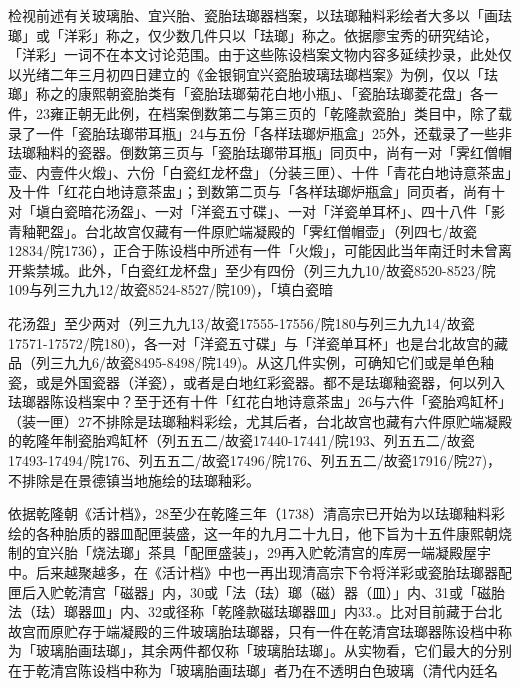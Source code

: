 
检视前述有关玻璃胎、宜兴胎、瓷胎珐瑯器档案，以珐瑯釉料彩绘者大多以「画珐瑯」或「洋彩」称之，仅少数几件只以「珐瑯」称之。依据廖宝秀的研究结论，「洋彩」一词不在本文讨论范围。由于这些陈设档案文物内容多延续抄录，此处仅以光绪二年三月初四日建立的《金银铜宜兴瓷胎玻璃珐瑯档案》为例，仅以「珐瑯」称之的康熙朝瓷胎类有「瓷胎珐瑯菊花白地小瓶」、「瓷胎珐瑯菱花盘」各一件，23雍正朝无此例，在档案倒数第二与第三页的「乾隆款瓷胎」类目中，除了载录了一件「瓷胎珐瑯带耳瓶」24与五份「各样珐瑯炉瓶盒」25外，还载录了一些非珐瑯釉料的瓷器。倒数第三页与「瓷胎珐瑯带耳瓶」同页中，尚有一对「霁红僧帽壶、内壹件火煅」、六份「白瓷红龙杯盘」（分装三匣）、十件「青花白地诗意茶盅」及十件「红花白地诗意茶盅」；到数第二页与「各样珐瑯炉瓶盒」同页者，尚有十对「塡白瓷暗花汤盌」、一对「洋瓷五寸碟」、一对「洋瓷单耳杯」、四十八件「影青釉靶盌」。台北故宫仅藏有一件原贮端凝殿的「霁红僧帽壶」（列四七/故瓷12834/院1736），正合于陈设档中所述有一件「火煅」，可能因此当年南迁时未曾离开紫禁城。此外，「白瓷红龙杯盘」至少有四份（列三九九10/故瓷8520-8523/院109与列三九九12/故瓷8524-8527/院109)，「填白瓷暗

\vfill
\begin{BookNotes}
\end{BookNotes}


\noindent 花汤盌」至少两对（列三九九13/故瓷17555-17556/院180与列三九九14/故瓷17571-17572/院180)，各一对「洋瓷五寸碟」与「洋瓷单耳杯」也是台北故宫的藏品（列三九九6/故瓷8495-8498/院149)。从这几件实例，可确知它们或是单色釉瓷，或是外国瓷器（洋瓷），或者是白地红彩瓷器。都不是珐瑯釉瓷器，何以列入珐瑯器陈设档案中？至于还有十件「红花白地诗意茶盅」26与六件「瓷胎鸡缸杯」（装一匣）27不排除是珐瑯釉料彩绘，尤其后者，台北故宫也藏有六件原贮端凝殿的乾隆年制瓷胎鸡缸杯（列五五二/故瓷17440-17441/院193、列五五二/故瓷17493-17494/院176、列五五二/故瓷17496/院176、列五五二/故瓷17916/院27)，不排除是在景德镇当地施绘的珐瑯釉彩。

依据乾隆朝《活计档》，28至少在乾隆三年（1738）清高宗已开始为以珐瑯釉料彩绘的各种胎质的器皿配匣装盛，这一年的九月二十九日，他下旨为十五件康熙朝烧制的宜兴胎「烧法瑯」茶具「配匣盛装」，29再入贮乾清宫的库房一端凝殿屋宇中。后来越聚越多，在《活计档》中也一再出现清高宗下令将洋彩或瓷胎珐瑯器配匣后入贮乾清宫「磁器」内，30或「法（珐）瑯（磁）器（皿）」内、31或「磁胎法（珐）瑯器皿」内、32或径称「乾隆款磁珐瑯器皿」内33.。比对目前藏于台北故宫而原贮存于端凝殿的三件玻璃胎珐瑯器，只有一件在乾清宫珐瑯器陈设档中称为「玻璃胎画珐瑯」，其余两件都仅称「玻璃胎珐瑯」。从实物看，它们最大的分别在于乾清宫陈设档中称为「玻璃胎画珐瑯」者乃在不透明白色玻璃（清代内廷名

